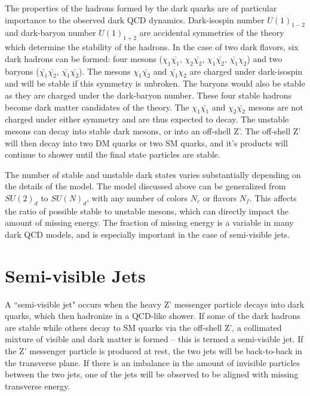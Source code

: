 The properties of the hadrons formed by the dark quarks are of particular importance to the observed dark QCD dynamics. Dark-isospin number $U(1)_{1-2}$ and dark-baryon number $U(1)_{1+2}$ are accidental symmetries of the theory which determine the stability of the hadrons. In the case of two dark flavors, six dark hadrons can be formed: four mesons ($\chi_1\bar{\chi_1}$, $\chi_2\bar{\chi_2}$, $\chi_1\bar{\chi_2}$, $\bar{\chi_1}\chi_2$) and two baryons ($\bar{\chi_1}\bar{\chi_2}$, $\bar{\chi_1}\bar{\chi_2}$). The mesons $\chi_1\bar{\chi_2}$ and $\bar{\chi_1}\chi_2$ are charged under dark-isospin and will be stable if this symmetry is unbroken. The baryons would also be stable as they are charged under the dark-baryon number. These four stable hadrons become dark matter candidates of the theory. The $\chi_1\bar{\chi_1}$ and $\chi_2\bar{\chi_2}$ mesons are not charged under either symmetry and are thus expected to decay. The unstable mesons can decay into stable dark mesons, or into an off-shell Z'. The off-shell Z' will then decay into two DM quarks or two SM quarks, and it's products will continue to shower until the final state particles are stable.\par

The number of stable and unstable dark states varies substantially depending on the details of the model. The model discussed above can be generalized from $SU(2)_d$ to $SU(N)_d$, with any number of colors $N_c$ or flavors $N_f$. This affects the ratio of possible stable to unstable mesons, which can directly impact the amount of missing energy. The fraction of missing energy is a variable in many dark QCD models, and is especially important in the case of semi-visible jets.

\section{Semi-visible Jets}
\label{sec:semivisiblejets}

A ``semi-visible jet" occurs when the heavy Z' messenger particle decays into dark quarks, which then hadronize in a QCD-like shower. If some of the dark hadrons are stable while others decay to SM quarks via the off-shell Z', a collimated mixture of visible and dark matter is formed – this is termed a semi-visible jet. If the Z' messenger particle is produced at rest, the two jets will be back-to-back in the transverse plane. If there is an imbalance in the amount of invisible particles between the two jets, one of the jets will be observed to be aligned with missing transverse energy. \par


